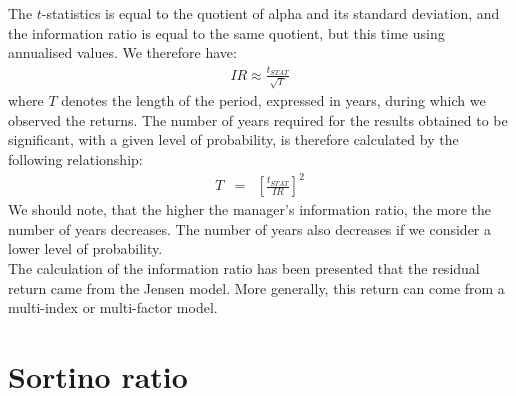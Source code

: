 The $t$-statistics is equal to the quotient of alpha and its standard deviation, and the information ratio is equal to the same quotient, but this time using annualised values. We therefore have:
\begin{eqnarray}
	IR \approx \frac{t_{STAT}}{\sqrt{T}}
\end{eqnarray}
where $T$ denotes the length of the period, expressed in years, during which we observed the returns. The number of years required for the results obtained to be significant, with a given level of probability, is therefore calculated by the following relationship:
\begin{eqnarray}
	T &=& \left[\frac{t_{STAT}}{IR}\right]^{2}
\end{eqnarray}
We should note, that the higher the manager's information ratio, the more the number of years decreases. The number of years also decreases if we consider a lower level of probability.\\
The calculation of the information ratio has been presented that the residual return came from the Jensen model. More generally, this return can come from a multi-index or multi-factor model.

\section{Sortino ratio}

